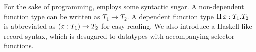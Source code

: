 
For the sake of programming, \sufcc employs some syntactic sugar. A
non-dependent function type can be written as $T_{{\mathrm{1}}}  \rightarrow  T_{{\mathrm{2}}}$. A
dependent function type $\Pi \, \mathit{x}  :  T_{{\mathrm{1}}}  .  T_{{\mathrm{2}}}$ is abbreviated as
$(  \mathit{x}  :  T_{{\mathrm{1}}}  )  \rightarrow  T_{{\mathrm{2}}}$ for easy reading. We also introduce a
Haskell-like record syntax, which is desugared to datatypes with
accompanying selector functions.


